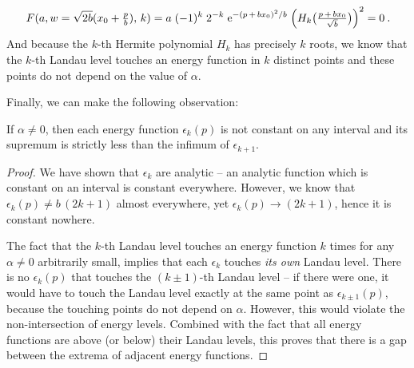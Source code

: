 \begin{equation*}
    F(a, w = \sqrt{2b} ( x_0 + \tfrac{p}{b} ), \, k) =
    a \;
    (-1)^k \;
    2^{-k} \;
    \mathrm{e}^{-( p \, + \, b x_0)^2 / b} \;
    \Big( H_k\big(\tfrac{p \, + \, b x_0}{\sqrt{b}}\big) \Big)^2
    = 0
    \: .
\end{equation*}
And because the $k$-th Hermite polynomial $H_k$ has precisely $k$ roots, we know that the $k$-th Landau level touches an energy function in $k$ distinct points and these points do not depend on the value of $\alpha$.

Finally, we can make the following observation:
\begin{claim}
    If $\alpha \neq 0$, then each energy function $\epsilon_k(p)$ is not constant on any interval and its supremum is strictly less than the infimum of $\epsilon_{k+1}$.
\end{claim}
\begin{proof}
    We have shown that $\epsilon_k$ are analytic – an analytic function which is constant on an interval is constant everywhere. However, we know that $\epsilon_k(p) \neq b \, (2k+1)$ almost everywhere, yet $\epsilon_k(p) \to (2k+1)$, hence it is constant nowhere.

    The fact that the $k$-th Landau level touches an energy function $k$ times for any $\alpha \neq 0$ arbitrarily small, implies that each $\epsilon_k$ touches \textit{its own} Landau level. There is no $\epsilon_k(p)$ that touches the $(k\pm 1)$-th Landau level – if there were one, it would have to touch the Landau level exactly at the same point as $\epsilon_{k\pm 1}(p)$, because the touching points do not depend on $\alpha$. However, this would violate the non-intersection of energy levels. Combined with the fact that all energy functions are above (or below) their Landau levels, this proves that there is a gap between the extrema of adjacent energy functions.
\end{proof}

